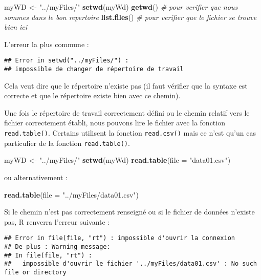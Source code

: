 \documentclass[]{book}
\newenvironment{Shaded}{\begin{snugshade}}{\end{snugshade}}
\newcommand{\KeywordTok}[1]{\textcolor[rgb]{0.13,0.29,0.53}{\textbf{#1}}}
\newcommand{\DataTypeTok}[1]{\textcolor[rgb]{0.13,0.29,0.53}{#1}}
\newcommand{\StringTok}[1]{\textcolor[rgb]{0.31,0.60,0.02}{#1}}
\newcommand{\CommentTok}[1]{\textcolor[rgb]{0.56,0.35,0.01}{\textit{#1}}}
\newcommand{\NormalTok}[1]{#1}
\theoremstyle{definition}
\theoremstyle{definition}
\theoremstyle{definition}
\theoremstyle{remark}
\begin{document}
\begin{Shaded}
\begin{Highlighting}[]
\NormalTok{myWD <-}\StringTok{ "../myFiles/"}
\KeywordTok{setwd}\NormalTok{(myWd)}
\KeywordTok{getwd}\NormalTok{() }\CommentTok{# pour verifier que nous sommes dans le bon repertoire}
\KeywordTok{list.files}\NormalTok{() }\CommentTok{# pour verifier que le fichier se trouve bien ici}
\end{Highlighting}
\end{Shaded}

L'erreur la plus commune :

\begin{verbatim}
## Error in setwd("../myFiles/") : 
## impossible de changer de répertoire de travail
\end{verbatim}

Cela veut dire que le répertoire n'existe pas (il faut vérifier que la
syntaxe est correcte et que le répertoire existe bien avec ce chemin).

Une fois le répertoire de travail correctement défini ou le chemin
relatif vers le fichier correctement établi, nous pouvons lire le
fichier avec la fonction \texttt{read.table()}. Certains utilisent la
fonction \texttt{read.csv()} mais ce n'est qu'un cas particulier de la
fonction \texttt{read.table()}.

\begin{Shaded}
\begin{Highlighting}[]
\NormalTok{myWD <-}\StringTok{ "../myFiles/"}
\KeywordTok{setwd}\NormalTok{(myWd)}
\KeywordTok{read.table}\NormalTok{(}\DataTypeTok{file =} \StringTok{"data01.csv"}\NormalTok{)}
\end{Highlighting}
\end{Shaded}

ou alternativement :

\begin{Shaded}
\begin{Highlighting}[]
\KeywordTok{read.table}\NormalTok{(}\DataTypeTok{file =} \StringTok{"../myFiles/data01.csv"}\NormalTok{)}
\end{Highlighting}
\end{Shaded}

Si le chemin n'est pas correctement renseigné ou si le fichier de
données n'existe pas, R renverra l'erreur suivante :

\begin{verbatim}
## Error in file(file, "rt") : impossible d'ouvrir la connexion
## De plus : Warning message:
## In file(file, "rt") :
##   impossible d'ouvrir le fichier '../myFiles/data01.csv' : No such file or directory
\end{verbatim}
\end{document}
